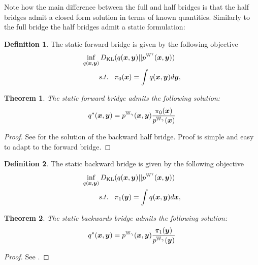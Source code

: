 \documentclass[a4paper,12pt,twoside,openright]{report}
\newtheorem{theorem}{Theorem}
\theoremstyle{definition}
\newtheorem{definition}{Definition}[section]
\begin{document}
Note how the main difference between the full and half bridges is that the half bridges admit a closed form solution in terms of known quantities. Similarly to the full bridge the half bridges admit a static formulation:

\begin{definition}
The static forward bridge is given by the following objective
 \begin{align}\label{eq:static_bridge_forward}
        \inf_{q({\bm{x}},{\bm{y}})} D_{\mathrm{KL}}  &(q({\bm{x}},{\bm{y}}) || p^{\mathbb{W}^{\gamma}}({\bm{x}},{\bm{y}})) \nonumber \\
        s.t. \;\;\;& \pi_0({\bm{x}}) = \int q({\bm{x}},{\bm{y}}) d{\bm{y}}, 
\end{align}
\end{definition}
\begin{theorem}\label{thrm:static_half_forward}
     The static forward bridge admits the following solution:
     \begin{align}
         q^{*}({\bm{x}},{\bm{y}}) = p^{\mathbb{W}_{\gamma}}({\bm{x}}, {\bm{y}})\frac{\pi_0({\bm{x}})}{p^{\mathbb{W}_{\gamma}}({\bm{x}})}
     \end{align}
\end{theorem}
\begin{proof}
See \cite{pavon2018data} for the solution of the backward half bridge. Proof is simple and easy to adapt to the forward bridge. 
\end{proof}
\begin{definition}
The static backward bridge is given by the following objective
 \begin{align}\label{eq:static_bridge_backward}
        \inf_{q({\bm{x}},{\bm{y}})} D_{\mathrm{KL}}  &(q({\bm{x}},{\bm{y}}) || p^{\mathbb{W}^{\gamma}}({\bm{x}},{\bm{y}})) \nonumber \\
        s.t. \;\;\;& \pi_1({\bm{y}}) = \int q({\bm{x}},{\bm{y}}) d{\bm{x}}, 
\end{align}
\end{definition}
\begin{theorem}\label{thrm:static_half_backward}
     The static backwards bridge admits the following solution:
     \begin{align}
         q^{*}({\bm{x}},{\bm{y}}) = p^{\mathbb{W}_{\gamma}}({\bm{x}}, {\bm{y}})\frac{\pi_1({\bm{y}})}{p^{\mathbb{W}_{\gamma}}({\bm{y}})}
     \end{align}
\end{theorem}
\begin{proof}
See \cite{pavon2018data}.
\end{proof}


\end{document}

